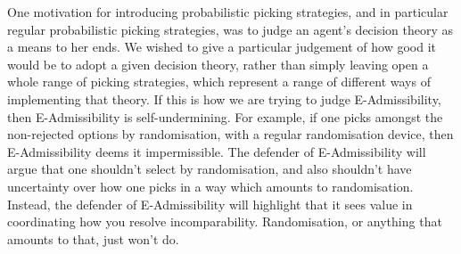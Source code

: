 \documentclass[a4paper]{article}
\renewcommand\P{\mathbb{P}} %
\newcommand\EU{\mathrm{EU}}
\newcommand\EAd{\mathrm{EAd}}
\newcommand{\IB}{\mathbb{B}}
\newcommand{\IP}{\P}
\newcommand{\todoold}[2][]{\todo[backgroundcolor=white,bordercolor=orange!10,linecolor=gray!10, #1,caption={},textcolor=gray]{Pre-rev: #2}}
\newcommand{\todooldinfo}[2][]{\todoold[#1]{#2}}
\newcommand\SetDelimiter[1][]{
	\nonscript\,#1\vert \allowbreak \nonscript\,\mathopen{}}
\providecommand\given{\SetDelimiter}
\newenvironment{CCM rewritten}
{\begingroup\color{blue}} %
{\endgroup}              %
\begin{document}



\begin{comment}
So, at least when we consider regular probabilistic picking strategies, things have become pretty bad for E-Admissibility: given some reasonable constraints on your uncertainty about the decision problem you'll face, the regular probabilistic picking strategies that pick for E-Admissibility are not themselves E-Admissible. And so, in this sense, E-Admissibility is self-undermining.

{
	There is a more fundamental point here: however one is going to judge choice functions, each probability, $p$, will think that $\EU_p$ is optimal; and so E-Admissibility will only judge expected utility theory as acceptable. When we considered (deterministic) strategies, we were accepting $\EU$ strategies as E-Admissibility strategies, so had some E-Admissibility strategies evaluated as E-Admissible. However, if we are judging the choice function by assigning a single evaluation of it, taking the imprecision into account, it will distinguish it from expected utility theory,  and thus all probability functions will think something else is better, namely being $\EU_p$ for the $p$ doing the evaluation; and thus, E-Admissibility is not itself E-Admissible. 
	}

\end{comment}



	
	
		One motivation for introducing probabilistic picking strategies, and in particular regular probabilistic picking strategies, was to judge an agent's decision theory as a means to her ends. We wished to give a particular judgement of how good it would be to adopt a given decision theory, rather than simply leaving open a whole range of picking strategies, which represent a range of different ways of implementing that theory.
	If this is how we are trying to judge E-Admissibility, then E-Admissibility is self-undermining.
	For example, if one picks amongst the non-rejected options by randomisation, with a regular randomisation device, then E-Admissibility deems it impermissible. 
	The defender of E-Admissibility will argue that one shouldn't select by randomisation, and also shouldn't have uncertainty over how one picks in a way which amounts to randomisation. 
	Instead, the defender of E-Admissibility will highlight that it sees value in coordinating how you resolve incomparability. Randomisation, or anything that amounts to that, just won't do. 
	
\end{document}
